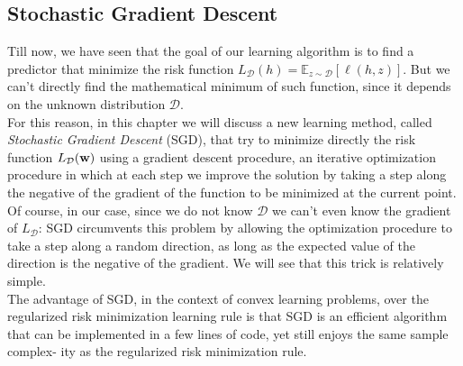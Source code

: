 \documentclass[12pt]{report}
\theoremstyle{plain}
\newcommand\mcl[1]{\mathcal{#1}}
\begin{document}
\begin{flushleft}
\chapter{Stochastic Gradient Descent}
Till now, we have seen that the goal of our learning algorithm is to find a predictor that minimize the risk function $L_\mcl{D}(h) = \mathds{E}_{z\sim\mcl{D}}\left[\ell(h,z)\right]$. But we can't directly find the mathematical minimum of such function, since it depends on the unknown distribution $\mcl{D}$.\\
For this reason, in this chapter we will discuss a new learning method, called \textit{Stochastic Gradient Descent} (SGD), that try to minimize directly the risk function $L_\mcl{D}(\vb{w})$ using a gradient descent procedure, an iterative optimization
procedure in which at each step we improve the solution by taking a step along the
negative of the gradient of the function to be minimized at the current point.\\
Of course, in our case, since we do not know $\mcl{D}$ we can't even know the gradient of $L_\mcl{D}$: SGD circumvents this problem by allowing the optimization procedure to take a step along a random direction, as long as the expected value of the direction is the negative of the gradient. We will see that this trick is relatively simple.\\
The advantage of SGD, in the context of convex learning problems, over the
regularized risk minimization learning rule is that SGD is an efficient algorithm that
can be implemented in a few lines of code, yet still enjoys the same sample complex-
ity as the regularized risk minimization rule.


\end{flushleft}
\end{document}
